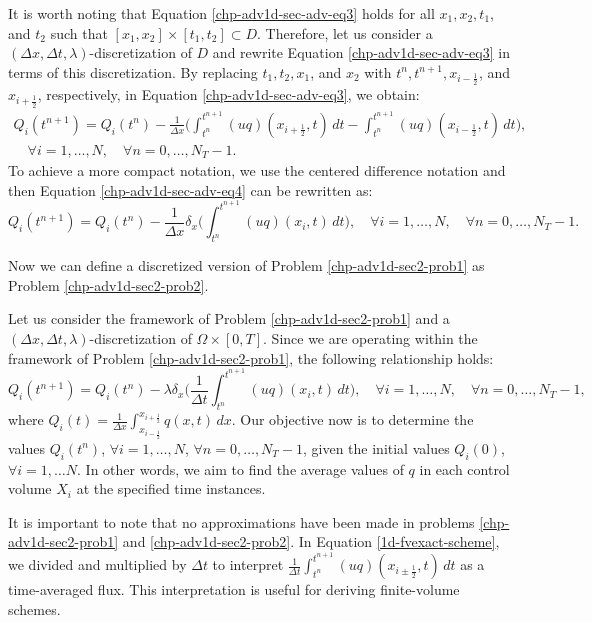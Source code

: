 It is worth noting that Equation \eqref{chp-adv1d-sec-adv-eq3} holds for all $x_1, x_2, t_1$, and $t_2$ such that $[x_1, x_2]
\times [t_1, t_2] \subset D$. Therefore, let us consider a $(\Delta x, \Delta t, \lambda)$-discretization of $D$ and 
rewrite Equation \eqref{chp-adv1d-sec-adv-eq3} in terms of this discretization. By replacing $t_1, t_2, x_1$, and $x_2$ with
$t^{n}, t^{n+1}, x_{i-\frac{1}{2}}$, and $x_{i+\frac{1}{2}}$, respectively, in Equation \eqref{chp-adv1d-sec-adv-eq3}, we obtain:
\begin{equation}
    \label{chp-adv1d-sec-adv-eq4}
	\begin{aligned}
		{Q}_i(t^{n+1}) =  {Q}_i(t^{n}) -
		\frac{1}{\Delta x}\bigg( \int_{t^{n}}^{t^{n+1}}
        	{(uq)}(x_{i+\frac{1}{2}}, t) \,dt -
		\int_{t^{n}}^{t^{n+1}}{(uq)}(x_{i-\frac{1}{2}}, t) \,dt \bigg), \\
		\quad \forall i = 1, \ldots, N,
		\quad \forall n = 0, \ldots, N_T-1.
	\end{aligned}
\end{equation}
To achieve a more compact notation, we use the centered difference notation
and then Equation \eqref{chp-adv1d-sec-adv-eq4} can be rewritten as:
\begin{equation}
    \label{chp-adv1d-sec-adv-eq6}
    {Q}_i(t^{n+1}) =  {Q}_i(t^{n}) -
	\frac{1}{\Delta x} \delta _x\bigg( \int_{t^{n}}^{t^{n+1}}
        {(uq)}(x_{i}, t) \,dt \bigg),
        \quad \forall i = 1, \ldots, N,
        \quad \forall n = 0, \ldots, N_T-1.
\end{equation}

Now we can define a discretized version of Problem \ref{chp-adv1d-sec2-prob1} as Problem \ref{chp-adv1d-sec2-prob2}.
\begin{prob}
	\label{chp-adv1d-sec2-prob2}
	Let us consider the framework of Problem \ref{chp-adv1d-sec2-prob1} and a $(\Delta x, \Delta t, \lambda)$-discretization of 
	$\Omega \times [0,T]$. Since we are operating within the framework of Problem \ref{chp-adv1d-sec2-prob1}, the following relationship holds:
	\begin{equation}
		\label{1d-fvexact-scheme}
		{Q}_i(t^{n+1}) = {Q}_i(t^{n}) - \lambda \delta_x\bigg( \frac{1}{\Delta t}\int_{t^{n}}^{t^{n+1}}{(uq)}(x_{i}, t) \,dt \bigg),
		 \quad \forall i = 1, \ldots, N, \quad \forall n = 0, \ldots, N_T-1,
	\end{equation}
	where ${Q}_i(t) = \frac{1}{\Delta x}\int_{x_{i-\frac{1}{2}}}^{x_{i+\frac{1}{2}}} {q}(x,t) \,dx$. 
	Our objective now is to determine the values ${Q}_i(t^{n})$, $\forall i = 1, \ldots, N$, $\forall n = 0, \ldots, N_T-1$,
	given the initial values ${Q}_i(0)$, $\forall i = 1, \ldots N$. 
	In other words, we aim to find the average values of ${q}$ in each control volume $X_i$ at the specified time instances.
\end{prob}
It is important to note that no approximations have been made in problems \eqref{chp-adv1d-sec2-prob1} and \eqref{chp-adv1d-sec2-prob2}. 
In Equation \eqref{1d-fvexact-scheme}, we divided and multiplied by $\Delta t$ to interpret
$\frac{1}{\Delta t}\int_{t^{n}}^{t^{n+1}}({uq})(x_{i\pm \frac{1}{2}}, t) \,dt$ 
as a time-averaged flux. This interpretation is useful for deriving finite-volume schemes.

